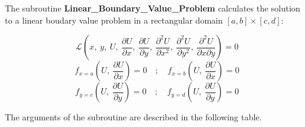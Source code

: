The subroutine \textbf{Linear\_Boundary\_Value\_Problem} calculates the solution to a linear boudary value problem in a rectangular domain $[a,b] \times [c,d]$:

\begin{equation*}
\mathscr{L}\left(x,\ y,\ U, \ \frac{\partial U}{\partial x}, \ \frac{\partial U}{\partial y}, \ \frac{\partial^2 U}{\partial x^2}, \ \frac{\partial^2 U}{\partial y^2}, \ \frac{\partial^2 U}{\partial x \partial y} \right) = 0
\end{equation*}
\begin{equation*}
f_{x=a}\left(U, \ \frac{\partial U}{\partial x}\right)=0  \quad ; \quad f_{x=b}\left(U, \ \frac{\partial U}{\partial x}\right)=0  
\end{equation*}
\begin{equation*}
f_{y=c}\left(U, \ \frac{\partial U}{\partial y}\right)=0  \quad ; \quad f_{y=d}\left(U, \ \frac{\partial U}{\partial y}\right)=0  
\end{equation*}



The arguments of the subroutine are described in the following table.

